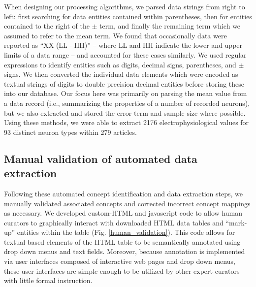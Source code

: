 \documentclass{template/frontiersSCNS} %
\begin{document}
When designing our processing algorithms, we parsed data strings from right to left: 
first searching for data entities contained within parentheses, then for entities contained to the right of the $\pm$ term, and finally the remaining term which we assumed to refer to the mean term.  
We found that occasionally data were reported as ``XX (LL - HH)'' -- where LL and HH indicate the lower and upper limits of a data range -- and accounted for these cases similarly.  
We used regular expressions to identify entities such as digits, decimal signs, parentheses, and $\pm$ signs.  
We then converted the individual data elements which were encoded as textual strings of digits to double precision decimal entities before storing these into our database.  
Our focus here was primarily on parsing the mean value from a data record (i.e., summarizing the properties of a number of recorded neurons), but we also extracted and stored the error term and sample size where possible.  
Using these methods, we were able to extract 2176 electrophysiological values for 93 distinct neuron types within 279 articles.

\subsection{Manual validation of automated data extraction}
Following these automated concept identification and data extraction steps, we manually validated associated concepts and corrected incorrect concept mappings as necessary.  
We developed custom-HTML and javascript code to allow human curators to graphically interact with downloaded HTML data tables and ``mark-up'' entities within the table (Fig. \ref{human_validation}).  
This code allows for textual based elements of the HTML table to be semantically annotated using drop down menus and text fields.  
Moreover, because annotation is implemented via user interfaces composed of interactive web pages and drop down menus, these user interfaces are simple enough to be utilized by other expert curators with little formal instruction. 
\end{document}

